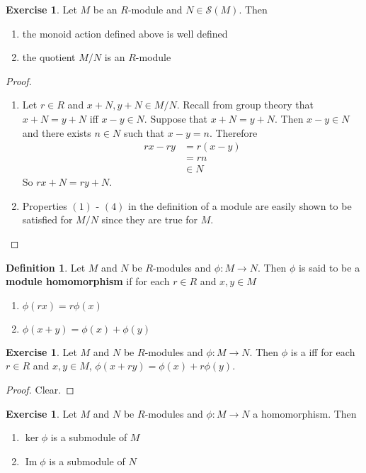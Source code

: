\documentclass[12pt]{amsart}
\theoremstyle{definition}
\newtheorem{defn}[definition]{Definition}
\newtheorem{ex}[definition]{Exercise}
\newcommand{\MS}{\mathcal{S}}
\DeclareMathOperator{\Img}{Im}
\begin{document}
	\begin{ex} 
	Let $M$ be an $R$-module and $N \in \MS(M)$. Then
	\begin{enumerate}
	\item the monoid action defined above is well defined
	\item the quotient $M/N$ is an $R$-module
	\end{enumerate}
	\end{ex}
	
	\begin{proof}\
	\begin{enumerate}
	\item Let $r \in R$ and $x +N, y +N \in M/N $. Recall from group theory that $x + N = y + N$ iff $x-y \in N$. Suppose that $x + N = y + N$. Then $x - y \in N$ and there exists $n \in N$ such that $x-y = n$. Therefore
	\begin{align*}
	rx - ry 
	&= r(x-y) \\
	&= rn \\
	&\in N
	\end{align*}
	So $rx + N = ry + N$.
	\item Properties $(1)$ - $(4)$ in the definition of a module are easily shown to be satisfied for $M/N$ since they are true for $M$.
	\end{enumerate}
	\end{proof}
	
	\begin{defn}
	Let $M$ and $N$ be $R$-modules and $\phi:M \rightarrow N$. Then $\phi$ is said to be a \textbf{module homomorphism} if for each $r \in R$ and $x,y \in M$
	\begin{enumerate}
	\item $\phi(rx) = r\phi(x)$
	\item $\phi(x+y) = \phi(x) + \phi(y)$
	\end{enumerate}
	\end{defn}	
	
	\begin{ex}
	Let $M$ and $N$ be $R$-modules and $\phi:M \rightarrow N$. Then $\phi$ is a  iff for each $r \in R$ and $x,y \in M$, $\phi(x+ry) = \phi(x) + r \phi(y)$.
	\end{ex}
	
	\begin{proof}
	Clear.
	\end{proof}
	
	\begin{ex}
	Let $M$ and $N$ be $R$-modules and $\phi:M \rightarrow N$ a homomorphism. Then 
	\begin{enumerate}
	\item $\ker \phi$ is a submodule of $M$
	\item $ \Img \phi$ is a submodule of $N$ 
	\end{enumerate}
	\end{ex}
	
\end{document}
